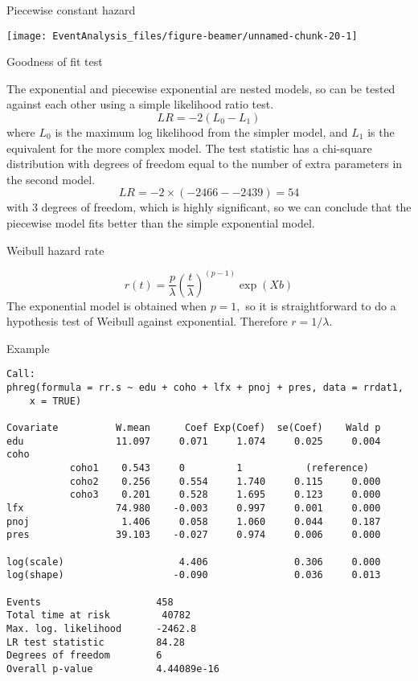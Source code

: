 \documentclass[10pt,ignorenonframetext,]{beamer}
\begin{document}
\begin{frame}{Piecewise constant hazard}

\begin{center}\texttt{[image: EventAnalysis\_files/figure-beamer/unnamed-chunk-20-1]} \end{center}

\end{frame}

\begin{frame}{Goodness of fit test}

The exponential and piecewise exponential are nested models, so can be
tested against each other using a simple likelihood ratio test. \[
LR = -2 (L_0 - L_1)
\] where \(L_0\) is the maximum log likelihood from the simpler model,
and \(L_1\) is the equivalent for the more complex model. The test
statistic has a chi-square distribution with degrees of freedom equal to
the number of extra parameters in the second model. \[
LR = -2 \times (-2466 - -2439) = 54
\] with 3 degrees of freedom, which is highly significant, so we can
conclude that the piecewise model fits better than the simple
exponential model.

\end{frame}

\begin{frame}{Weibull hazard rate}

\[
r(t) = \frac{p}{\lambda} \left( \frac{t}{\lambda} \right)^{(p-1)} \exp(Xb)
\] The exponential model is obtained when \(p = 1,\) so it is
straightforward to do a hypothesis test of Weibull against exponential.
Therefore \(r = 1/\lambda.\)

\end{frame}

\begin{frame}[fragile]{Example}

\scriptsize

\begin{verbatim}
Call:
phreg(formula = rr.s ~ edu + coho + lfx + pnoj + pres, data = rrdat1, 
    x = TRUE)

Covariate          W.mean      Coef Exp(Coef)  se(Coef)    Wald p
edu                11.097     0.071     1.074     0.025     0.004 
coho 
           coho1    0.543     0         1           (reference)
           coho2    0.256     0.554     1.740     0.115     0.000 
           coho3    0.201     0.528     1.695     0.123     0.000 
lfx                74.980    -0.003     0.997     0.001     0.000 
pnoj                1.406     0.058     1.060     0.044     0.187 
pres               39.103    -0.027     0.974     0.006     0.000 

log(scale)                    4.406               0.306     0.000 
log(shape)                   -0.090               0.036     0.013 

Events                    458 
Total time at risk         40782 
Max. log. likelihood      -2462.8 
LR test statistic         84.28 
Degrees of freedom        6 
Overall p-value           4.44089e-16
\end{verbatim}

\end{frame}
\end{document}
